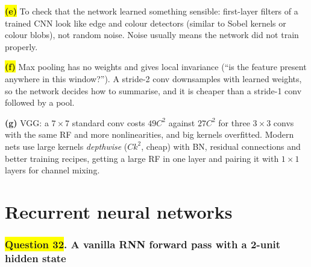 \documentclass[12pt,a4paper]{article}
\newcommand{\hlq}[1]{{\setlength{\fboxsep}{1.5pt}\colorbox{yellow}{#1}}}
\begin{document}
\hlq{\textbf{(e)}} To check that the network learned something sensible: first-layer filters of a trained CNN look like edge and colour detectors (similar to Sobel kernels or colour blobs), not random noise. Noise usually means the network did not train properly.

\hlq{\textbf{(f)}} Max pooling has no weights and gives local invariance (``is the feature present anywhere in this window?''). A stride-2 conv downsamples with learned weights, so the network decides how to summarise, and it is cheaper than a stride-1 conv followed by a pool.

\textbf{(g)} VGG: a $7\times7$ standard conv costs $49C^2$ against $27C^2$ for three $3\times3$ convs with the same RF and more nonlinearities, and big kernels overfitted. Modern nets use large kernels \emph{depthwise} ($Ck^2$, cheap) with BN, residual connections and better training recipes, getting a large RF in one layer and pairing it with $1\times1$ layers for channel mixing.
\part{Recurrent neural networks}

\section[Question 32. A vanilla RNN forward pass with a 2-unit hidden state]{\hlq{Question 32}. A vanilla RNN forward pass with a 2-unit hidden state}
\end{document}
